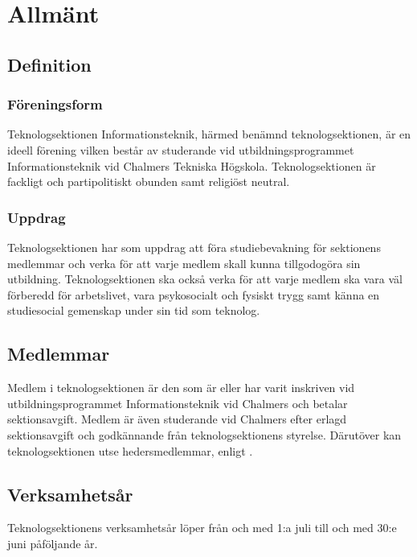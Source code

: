 \section{Allmänt}

\subsection{Definition}

\subsubsection{Föreningsform}
Teknologsektionen Informationsteknik, härmed benämnd teknologsektionen, är en ideell förening vilken består av studerande vid utbildningsprogrammet Informationsteknik vid Chalmers Tekniska Högskola. Teknologsektionen är fackligt och partipolitiskt obunden samt religiöst neutral.

\subsubsection{Uppdrag}
Teknologsektionen har som uppdrag att föra studiebevakning för
sektionens medlemmar och verka för att varje medlem skall kunna tillgodogöra
sin utbildning. Teknologsektionen ska också verka för att varje medlem ska vara
väl förberedd för arbetslivet, vara psykosocialt och fysiskt trygg samt känna en
studiesocial gemenskap under sin tid som teknolog.

\subsection{Medlemmar}

Medlem i teknologsektionen är den som är eller har varit inskriven vid utbildningsprogrammet Informationsteknik vid Chalmers och betalar sektionsavgift. Medlem är även studerande vid Chalmers efter erlagd sektionsavgift och godkännande från teknologsektionens styrelse. Därutöver kan teknologsektionen utse hedersmedlemmar, enligt .

\subsection{Verksamhetsår}
Teknologsektionens verksamhetsår löper från och med 1:a juli till och med 30:e juni påföljande år.